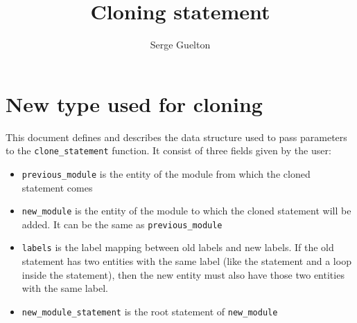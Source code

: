 \documentclass[a4paper]{article}
\title{Cloning statement}
\author{Serge Guelton}
\begin{document}
\maketitle
\sloppy

\section*{New type used for cloning}

This document defines and describes the data structure used to pass parameters to the \lstinline|clone_statement| function.
It consist of three fields given by the user:
\begin{itemize}
\item \lstinline|previous_module| is the entity of the module from which the cloned statement comes
\item \lstinline|new_module| is the entity of the module to which the cloned statement will be added. It can be the same as \lstinline|previous_module|
\item \lstinline|labels| is the label mapping between old labels and new labels. If the old statement has two entities with the same label (like the statement and a loop inside the statement), then the new entity must also have those two entities with the same label.
\item \lstinline|new_module_statement| is the root statement of \lstinline|new_module|
\end{itemize}

{}
{}

{}
\end{document}
